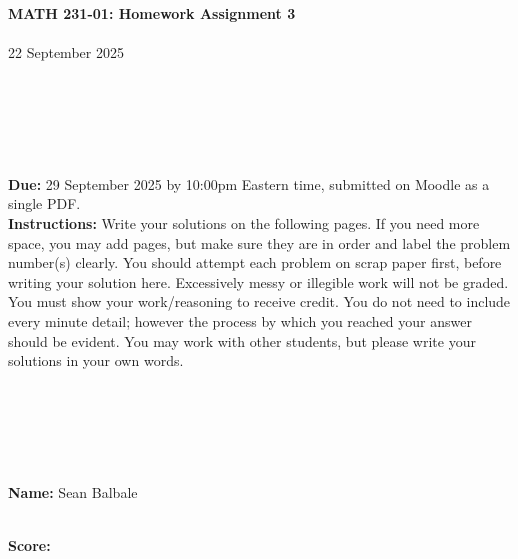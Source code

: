 \documentclass[reqno, 12pt]{amsart}
\begin{document}
\begin{center}
  {\bf MATH 231-01: Homework Assignment 3}\\~\\
  22 September 2025\\~\\~\\~\\~\\~\\
\end{center}

{\bf Due:} 29 September 2025 by 10:00pm Eastern time, submitted on Moodle as a single PDF.~\\


{\bf Instructions:} Write your solutions on the following pages. If you need more space, you may add pages, but make sure they are in order and label the problem number(s) clearly. You should attempt each problem on scrap paper first, before writing your solution here. Excessively messy or illegible work will not be graded. You must show your work/reasoning to receive credit. You do not need to include every minute detail; however the process by which you reached your answer should be evident. You may work with other students, but please write your solutions in your own words.

~\\~\\~\\~\\~\\
{\bf Name:} Sean Balbale

~\\
{\bf Score:}
\end{document}
